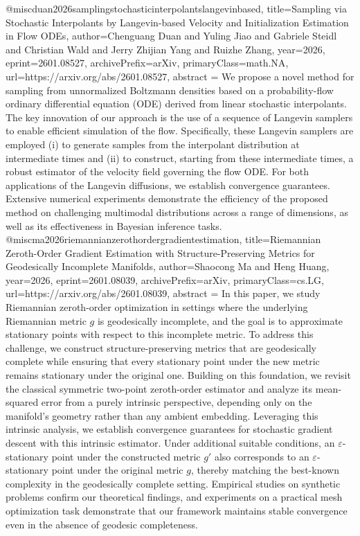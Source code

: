 {}@misc{duan2026samplingstochasticinterpolantslangevinbased,
      title={Sampling via Stochastic Interpolants by Langevin-based Velocity and Initialization Estimation in Flow ODEs}, 
      author={Chenguang Duan and Yuling Jiao and Gabriele Steidl and Christian Wald and Jerry Zhijian Yang and Ruizhe Zhang},
      year={2026},
      eprint={2601.08527},
      archivePrefix={arXiv},
      primaryClass={math.NA},
      url={https://arxiv.org/abs/2601.08527},
      abstract = {We propose a novel method for sampling from unnormalized Boltzmann densities based on a probability-flow ordinary differential equation (ODE) derived from linear stochastic interpolants. The key innovation of our approach is the use of a sequence of Langevin samplers to enable efficient simulation of the flow. Specifically, these Langevin samplers are employed (i) to generate samples from the interpolant distribution at intermediate times and (ii) to construct, starting from these intermediate times, a robust estimator of the velocity field governing the flow ODE. For both applications of the Langevin diffusions, we establish convergence guarantees. Extensive numerical experiments demonstrate the efficiency of the proposed method on challenging multimodal distributions across a range of dimensions, as well as its effectiveness in Bayesian inference tasks.}
}@misc{ma2026riemannianzerothordergradientestimation,
      title={Riemannian Zeroth-Order Gradient Estimation with Structure-Preserving Metrics for Geodesically Incomplete Manifolds}, 
      author={Shaocong Ma and Heng Huang},
      year={2026},
      eprint={2601.08039},
      archivePrefix={arXiv},
      primaryClass={cs.LG},
      url={https://arxiv.org/abs/2601.08039},
      abstract = {In this paper, we study Riemannian zeroth-order optimization in settings where the underlying Riemannian metric $g$ is geodesically incomplete, and the goal is to approximate stationary points with respect to this incomplete metric. To address this challenge, we construct structure-preserving metrics that are geodesically complete while ensuring that every stationary point under the new metric remains stationary under the original one. Building on this foundation, we revisit the classical symmetric two-point zeroth-order estimator and analyze its mean-squared error from a purely intrinsic perspective, depending only on the manifold's geometry rather than any ambient embedding. Leveraging this intrinsic analysis, we establish convergence guarantees for stochastic gradient descent with this intrinsic estimator. Under additional suitable conditions, an $ε$-stationary point under the constructed metric $g'$ also corresponds to an $ε$-stationary point under the original metric $g$, thereby matching the best-known complexity in the geodesically complete setting. Empirical studies on synthetic problems confirm our theoretical findings, and experiments on a practical mesh optimization task demonstrate that our framework maintains stable convergence even in the absence of geodesic completeness.}
}

